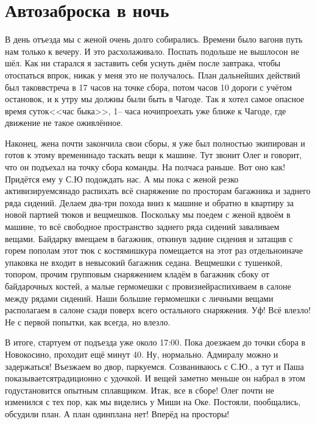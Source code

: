 \chapter{Автозаброска в ночь} 

В день отъезда мы с женой очень долго собирались. Времени было вагон\mdash в путь нам только к вечеру. И это расхолаживало. Поспать подольше не вышло\mdash сон не шёл. Как ни старался я заставить себя уснуть днём после завтрака, чтобы отоспаться впрок, никак у меня это не получалось. План дальнейших действий был таков\mdash встреча в 17 часов на точке сбора, потом часов 10 дороги с учётом остановок, и к утру мы должны были быть в Чагоде. Так я хотел самое опасное время суток\mdash <<час быка>>, 1\thinspace\nobreakdash-- часа ночи\mdash проехать уже ближе к Чагоде, где движение не такое оживлённое. 

Наконец, жена почти закончила свои сборы, я уже был полностью экипирован и готов к этому времени\mdash надо таскать вещи к машине. Тут звонит Олег и говорит, что он подъехал на точку сбора команды. На полчаса раньше. Вот оно как! Придётся ему у С.Ю подождать нас. А мы пока с женой резко активизируемся\mdash надо распихать всё снаряжение по просторам багажника и заднего ряда сидений. Делаем два-три похода вниз к машине и обратно в квартиру за новой партией тюков и вещмешков. Поскольку мы поедем с женой вдвоём в машине, то всё свободное пространство заднего ряда сидений заваливаем вещами. Байдарку вмещаем в багажник, откинув задние сидения и затащив с горем пополам этот тюк с костями\mdash шкура помещается на этот раз отдельно\mdash иначе упаковка не входит в невысокий багажник седана. Вещмешки с тушенкой, топором, прочим групповым снаряжением кладём в багажник сбоку от байдарочных костей, а малые гермомешки с провизией\mdash распихиваем в салоне между рядами сидений. Наши большие гермомешки с личными вещами располагаем в салоне сзади поверх всего остального снаряжения. Уф! Всё влезло! Не с первой попытки, как всегда, но влезло. 

В итоге, стартуем от подъезда уже около 17:00. Пока доезжаем до точки сбора в Новокосино, проходит ещё минут 40. Ну, нормально. Адмиралу можно и задержаться! Въезжаем во двор, паркуемся. Созваниваюсь с С.Ю., а тут и Паша показывается\mdash традиционно с удочкой. И вещей заметно меньше он набрал в этом году\mdash становится опытным сплавщиком. Итак, все в сборе! Олег почти не изменился с тех пор, как мы виделись у Миши на Оке. Постояли, пообщались, обсудили план. А план один\mdash плана нет! Вперёд на просторы! 

